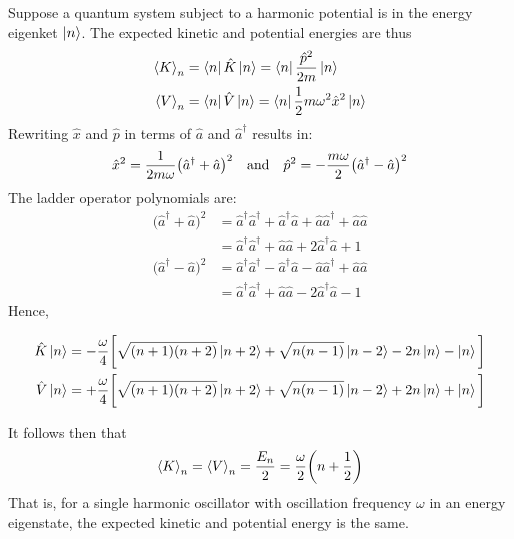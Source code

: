 \documentclass[nofootinbib,reprint,english]{revtex4-1}
\begin{document}
Suppose a quantum system subject to a harmonic potential is in the energy eigenket \(\ket{n}\). The expected kinetic and potential energies are thus
\begin{subequations}
\begin{align}
\expval{K}_n&=\bra{n}\hat{K}\ket{n}=\bra{n}\frac{\hat{p}^2}{2m}\ket{n}\\
\expval{V}_n&=\bra{n}\hat{V}\ket{n}=\bra{n}\frac{1}{2}m\omega^2\hat{x}^2\ket{n}
\end{align}
\end{subequations}
Rewriting \(\hat{x}\) and \(\hat{p}\) in terms of \(\hat{a}\) and \(\hat{a}^\dagger\) results in:
\begin{align*}
\hat{x}^2=\frac{1}{2m\omega}\big(\hat{a}^\dagger+\hat{a}\big)^2\qand\hat{p}^2=-\frac{m\omega}{2}\big(\hat{a}^\dagger-\hat{a}\big)^2
\end{align*}
The ladder operator polynomials are:
\begin{align*}
\big(\hat{a}^\dagger+\hat{a}\big)^2&=\hat{a}^\dagger\hat{a}^\dagger+\hat{a}^\dagger\hat{a}+\hat{a}\hat{a}^\dagger+\hat{a}\hat{a}\\
&=\hat{a}^\dagger\hat{a}^\dagger+\hat{a}\hat{a}+2\hat{a}^\dagger\hat{a}+1\\[0.25cm]
\big(\hat{a}^\dagger-\hat{a}\big)^2&=\hat{a}^\dagger\hat{a}^\dagger-\hat{a}^\dagger\hat{a}-\hat{a}\hat{a}^\dagger+\hat{a}\hat{a}\\
&=\hat{a}^\dagger\hat{a}^\dagger+\hat{a}\hat{a}-2\hat{a}^\dagger\hat{a}-1
\end{align*}
Hence,
\begin{widetext}
\begin{subequations}\label{eq:harmonic_oscillator_kinetic_and_potential_action}
\begin{align}
\hat{K}\ket{n}&=-\frac{\omega}{4}\bigg[\sqrt{(n+1)(n+2)}\ket{n+2}+\sqrt{n(n-1)}\ket{n-2}-2n\ket{n}-\ket{n}\bigg]\\
\hat{V}\ket{n}&=+\frac{\omega}{4}\bigg[\sqrt{(n+1)(n+2)}\ket{n+2}+\sqrt{n(n-1)}\ket{n-2}+2n\ket{n}+\ket{n}\bigg]
\end{align}
\end{subequations}
\end{widetext}
It follows then that
\begin{equation}
\expval{K}_n=\expval{V}_n=\frac{E_n}{2}=\frac{\omega}{2}\bigg(n+\frac{1}{2}\bigg)
\end{equation}
That is, for a single harmonic oscillator with oscillation frequency \(\omega\) in an energy eigenstate, the expected kinetic and potential energy is the same.
\end{document}
